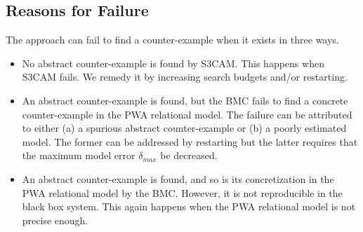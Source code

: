 \subsection{Reasons for Failure}
The approach can fail to find a counter-example when it exists in
three ways.

\begin{itemize}
\item No abstract counter-example is found by S3CAM. This happens when
    S3CAM fails. We remedy it by increasing search budgets and/or
    restarting.

\item An abstract counter-example is found, but the BMC fails to find
    a concrete counter-example in the PWA relational model. The failure
    can be attributed to either (a) a spurious abstract
    counter-example or (b) a poorly estimated model. The former can be
    addressed by restarting but the latter requires that the maximum
    model error $\delta_{max}$ be decreased.

\item An abstract counter-example is found, and so is its
    concretization in the PWA relational model by the BMC. However, it
    is not reproducible in the black box system. This again happens
    when the PWA relational model is not precise enough.
    \end{itemize}
